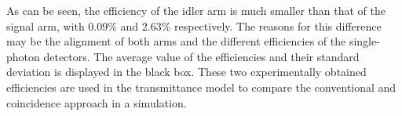 As can be seen, the efficiency of the idler arm is much smaller than that of the signal arm, with 0.09\% and 2.63\% respectively. The reasons for this difference may be the alignment of both arms and the different efficiencies of the single-photon detectors. The average value of the efficiencies and their standard deviation is displayed in the black box. \newline
These two experimentally obtained efficiencies are used in the transmittance model to compare the conventional and coincidence approach in a simulation.



